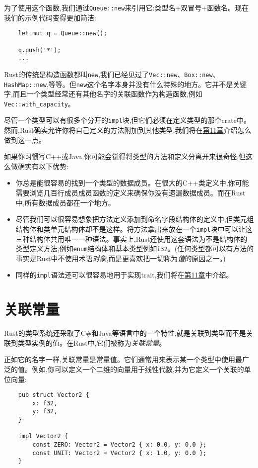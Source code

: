 为了使用这个函数,我们通过\texttt{Queue::new}来引用它:类型名+双冒号+函数名。现在我们的示例代码变得更加简洁:
\begin{verbatim}
    let mut q = Queue::new();

    q.push('*');
    ...
\end{verbatim}

Rust的传统是构造函数都叫\texttt{new},我们已经见过了\texttt{Vec::new}、\texttt{Box::new}、\texttt{HashMap::new},等等。但\texttt{new}这个名字本身并没有什么特殊的地方。它并不是关键字,而且一个类型经常还有其他名字的关联函数作为构造函数,例如\texttt{Vec::with\_capacity}。

尽管一个类型可以有很多个分开的\texttt{impl}块,但它们必须在定义类型的那个crate中。然而,Rust确实允许你将自己定义的方法附加到其他类型,我们将在\hyperref[ch11]{第11章}介绍怎么做到这一点。

如果你习惯写C++或Java,你可能会觉得将类型的方法和定义分离开来很奇怪,但这么做确实有以下优势:
\begin{itemize}
    \item 你总是能很容易的找到一个类型的数据成员。在很大的C++类定义中,你可能需要浏览几百行成员成员函数的定义来确保你没有遗漏数据成员。而在Rust中,所有数据成员都在一个地方。
    \item 尽管我们可以很容易想象把方法定义添加到命名字段结构体的定义中,但类元组结构体和类单元结构体却不是这样。将方法拿出来放在一个\texttt{impl}块中可以让这三种结构体共用唯一一种语法。事实上,Rust还使用这套语法为不是结构体的类型定义方法,例如\texttt{enum}结构体和基本类型例如\texttt{i32}。(任何类型都可以有方法的事实是Rust中不使用术语\emph{对象},而是更喜欢把一切称为\emph{值}的原因之一。)
    \item 同样的\texttt{impl}语法还可以很容易地用于实现trait,我们将在\hyperref[ch11]{第11章}中介绍。
\end{itemize}

\section{关联常量}
Rust的类型系统还采取了C\#和Java等语言中的一个特性,就是关联到类型而不是关联到类型实例的值。在Rust中,它们被称为\emph{关联常量}。

正如它的名字一样,关联常量是常量值。它们通常用来表示某一个类型中使用最广泛的值。例如,你可以定义一个二维的向量用于线性代数,并为它定义一个关联的单位向量:
\begin{verbatim}
    pub struct Vector2 {
        x: f32,
        y: f32,
    }

    impl Vector2 {
        const ZERO: Vector2 = Vector2 { x: 0.0, y: 0.0 };
        const UNIT: Vector2 = Vector2 { x: 1.0, y: 0.0 };
    }
\end{verbatim}

